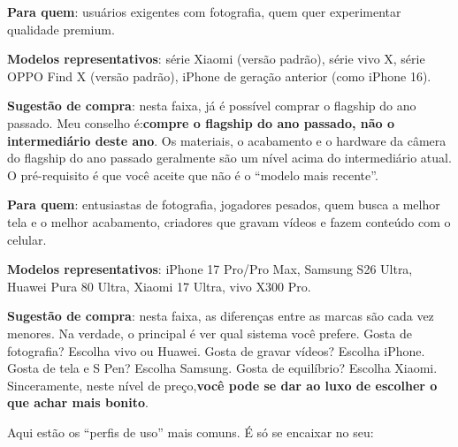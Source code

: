 
\textbf{Para quem}: usuários exigentes com fotografia, quem quer experimentar qualidade premium.

\textbf{Modelos representativos}: série Xiaomi (versão padrão), série vivo X, série OPPO Find X (versão padrão), iPhone de geração anterior (como iPhone 16).

\textbf{Sugestão de compra}: nesta faixa, já é possível comprar o flagship do ano passado. Meu conselho é:\textbf{compre o flagship do ano passado, não o intermediário deste ano}. Os materiais, o acabamento e o hardware da câmera do flagship do ano passado geralmente são um nível acima do intermediário atual. O pré-requisito é que você aceite que não é o “modelo mais recente”.


\textbf{Para quem}: entusiastas de fotografia, jogadores pesados, quem busca a melhor tela e o melhor acabamento, criadores que gravam vídeos e fazem conteúdo com o celular.

\textbf{Modelos representativos}: iPhone 17 Pro/Pro Max, Samsung S26 Ultra, Huawei Pura 80 Ultra, Xiaomi 17 Ultra, vivo X300 Pro.

\textbf{Sugestão de compra}: nesta faixa, as diferenças entre as marcas são cada vez menores. Na verdade, o principal é ver qual sistema você prefere. Gosta de fotografia? Escolha vivo ou Huawei. Gosta de gravar vídeos? Escolha iPhone. Gosta de tela e S Pen? Escolha Samsung. Gosta de equilíbrio? Escolha Xiaomi. Sinceramente, neste nível de preço,\textbf{você pode se dar ao luxo de escolher o que achar mais bonito}.


Aqui estão os “perfis de uso” mais comuns. É só se encaixar no seu:

